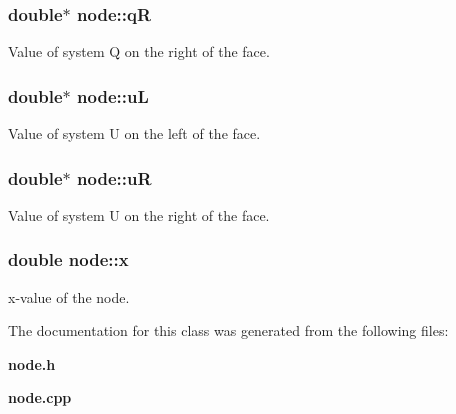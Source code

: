 \subsubsection[{q\-R}]{\setlength{\rightskip}{0pt plus 5cm}double$\ast$ node\-::q\-R}\label{classnode_ad013cb5981057c6350d713eec6628dce}


Value of system Q on the right of the face. 

\subsubsection[{u\-L}]{\setlength{\rightskip}{0pt plus 5cm}double$\ast$ node\-::u\-L}\label{classnode_a7599fcbb5f651ed36137ab87ed1a5a84}


Value of system U on the left of the face. 

\subsubsection[{u\-R}]{\setlength{\rightskip}{0pt plus 5cm}double$\ast$ node\-::u\-R}\label{classnode_a840c68dfb33d8f6ab1837863f1d017ef}


Value of system U on the right of the face. 

\subsubsection[{x}]{\setlength{\rightskip}{0pt plus 5cm}double node\-::x}\label{classnode_aabf3ca384568672adc30f70f01c9df10}


x-\/value of the node. 



The documentation for this class was generated from the following files\-:\begin{DoxyCompactItemize}
\item 
{\bf node.\-h}\item 
{\bf node.\-cpp}\end{DoxyCompactItemize}
